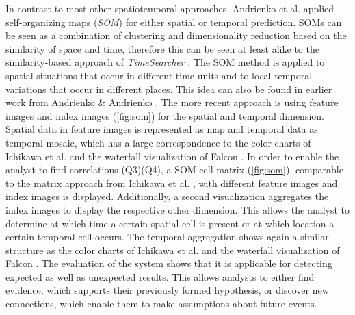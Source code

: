 \documentclass[electronic]{vgtc}             %
\begin{document}
In contrast to most other spatiotemporal approaches, Andrienko et al. \cite{Andrienko:2010:Space} applied self-organizing maps (\textit{SOM}) for either spatial or temporal prediction.
SOMs can be seen as a combination of clustering and dimensionality reduction based on the similarity of space and time, therefore this can be seen at least alike to the similarity-based approach of \textit{TimeSearcher} \cite{buono:2007}.
The SOM method is applied to spatial situations that occur in different time units and to local temporal variations that occur in different places.
This idea can also be found in earlier work from Andrienko \& Andrienko \cite{Andrienko:2005}.
The more recent approach is using feature images and index images (\autoref{fig:som}) for the spatial and temporal dimension.
Spatial data in feature images is represented as map and temporal data as temporal mosaic, which has a large correspondence to the color charts of Ichikawa et al. \cite{ichikawa:2002} and the waterfall visualization of Falcon \cite{steed:2017}.
In order to enable the analyst to find correlations (Q3)(Q4), a SOM cell matrix (\autoref{fig:som}), comparable to the matrix approach from Ichikawa et al. \cite{ichikawa:2002}, with different feature images and index images is displayed.
Additionally, a second visualization aggregates the index images to display the respective other dimension.
This allows the analyst to determine at which time a certain spatial cell is present or at which location a certain temporal cell occurs.
The temporal aggregation shows again a similar structure as the color charts of Ichikawa et al. \cite{ichikawa:2002} and the waterfall visualization of Falcon \cite{steed:2017}.
The evaluation of the system shows that it is applicable for detecting expected as well as unexpected results.
This allows analysts to either find evidence, which supports their previously formed hypothesis, or discover new connections, which enable them to make assumptions about future events. 
\end{document}
